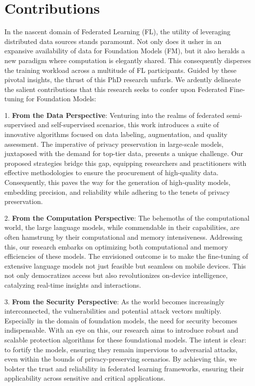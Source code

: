 \documentclass[withindex,glossary,firstyr]{cam-thesis}
\begin{document}
\section{Contributions} 
% 


In the nascent domain of Federated Learning (FL), the utility of leveraging distributed data sources stands paramount. Not only does it usher in an expansive availability of data for Foundation Models (FM), but it also heralds a new paradigm where computation is elegantly shared. This consequently disperses the training workload across a multitude of FL participants. Guided by these pivotal insights, the thrust of this PhD research unfurls. We ardently delineate the salient contributions that this research seeks to confer upon Federated Fine-tuning for Foundation Models:

1. \textbf{From the Data Perspective}: Venturing into the realms of federated semi-supervised and self-supervised scenarios, this work introduces a suite of innovative algorithms focused on data labeling, augmentation, and quality assessment. The imperative of privacy preservation in large-scale models, juxtaposed with the demand for top-tier data, presents a unique challenge. Our proposed strategies bridge this gap, equipping researchers and practitioners with effective methodologies to ensure the procurement of high-quality data. Consequently, this paves the way for the generation of high-quality models, embedding precision, and reliability while adhering to the tenets of privacy preservation.

2. \textbf{From the Computation Perspective}: The behemoths of the computational world, the large language models, while commendable in their capabilities, are often hamstrung by their computational and memory intensiveness. Addressing this, our research embarks on optimizing both computational and memory efficiencies of these models. The envisioned outcome is to make the fine-tuning of extensive language models not just feasible but seamless on mobile devices. This not only democratizes access but also revolutionizes on-device intelligence, catalyzing real-time insights and interactions.

3. \textbf{From the Security Perspective}: As the world becomes increasingly interconnected, the vulnerabilities and potential attack vectors multiply. Especially in the domain of foundation models, the need for security becomes indispensable. With an eye on this, our research aims to introduce robust and scalable protection algorithms for these foundational models. The intent is clear: to fortify the models, ensuring they remain impervious to adversarial attacks, even within the bounds of privacy-preserving scenarios. By achieving this, we bolster the trust and reliability in federated learning frameworks, ensuring their applicability across sensitive and critical applications.
\end{document}
